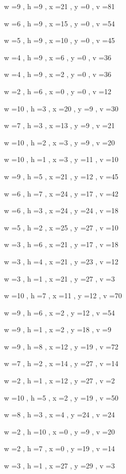 \documentclass[11pt]{article}
\begin{document}


w =9 , h =9 , x =21 , y =0 , v =81
\par
w =6 , h =9 , x =15 , y =0 , v =54
\par
w =5 , h =9 , x =10 , y =0 , v =45
\par
w =4 , h =9 , x =6 , y =0 , v =36
\par
w =4 , h =9 , x =2 , y =0 , v =36
\par
w =2 , h =6 , x =0 , y =0 , v =12
\par
w =10 , h =3 , x =20 , y =9 , v =30
\par
w =7 , h =3 , x =13 , y =9 , v =21
\par
w =10 , h =2 , x =3 , y =9 , v =20
\par
w =10 , h =1 , x =3 , y =11 , v =10
\par
w =9 , h =5 , x =21 , y =12 , v =45
\par
w =6 , h =7 , x =24 , y =17 , v =42
\par
w =6 , h =3 , x =24 , y =24 , v =18
\par
w =5 , h =2 , x =25 , y =27 , v =10
\par
w =3 , h =6 , x =21 , y =17 , v =18
\par
w =3 , h =4 , x =21 , y =23 , v =12
\par
w =3 , h =1 , x =21 , y =27 , v =3
\par
w =10 , h =7 , x =11 , y =12 , v =70
\par
w =9 , h =6 , x =2 , y =12 , v =54
\par
w =9 , h =1 , x =2 , y =18 , v =9
\par
w =9 , h =8 , x =12 , y =19 , v =72
\par
w =7 , h =2 , x =14 , y =27 , v =14
\par
w =2 , h =1 , x =12 , y =27 , v =2
\par
w =10 , h =5 , x =2 , y =19 , v =50
\par
w =8 , h =3 , x =4 , y =24 , v =24
\par
w =2 , h =10 , x =0 , y =9 , v =20
\par
w =2 , h =7 , x =0 , y =19 , v =14
\par
w =3 , h =1 , x =27 , y =29 , v =3
\par
\newpage
\end{document}
